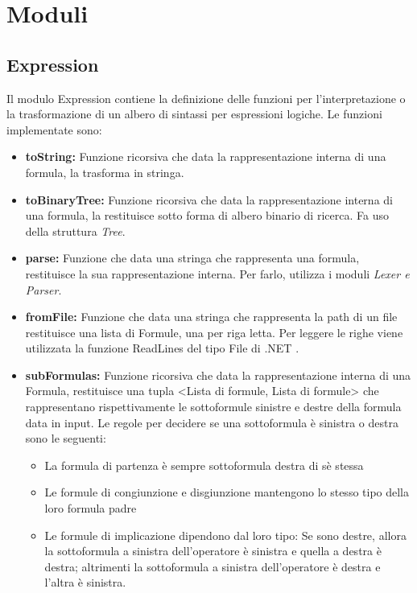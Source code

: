 \documentclass[\main/tesi.tex]{subfiles}
\begin{document}
\section{Moduli}

\subsection{Expression}
Il modulo Expression contiene la definizione delle funzioni per l'interpretazione o la trasformazione di un albero di sintassi per espressioni logiche. Le funzioni implementate sono:
\begin{itemize}
    \item \textbf{toString:} Funzione ricorsiva che data la rappresentazione interna di una formula, la trasforma in stringa.
    \item \textbf{toBinaryTree:} Funzione ricorsiva che data la rappresentazione interna di una formula, la restituisce sotto forma di albero binario di ricerca. Fa uso della struttura \textit{Tree}.
    \item \textbf{parse:} Funzione che data una stringa che rappresenta una formula, restituisce la sua rappresentazione interna. Per farlo, utilizza i moduli \textit{Lexer e Parser}.
    \item \textbf{fromFile:} Funzione che data una stringa che rappresenta la path di un file restituisce una lista di Formule, una per riga letta. Per leggere le righe viene utilizzata la funzione ReadLines del tipo File di .NET \cite{dotnet}.
    \item \textbf{subFormulas:} Funzione ricorsiva che data la rappresentazione interna di una Formula, restituisce una tupla <Lista di formule, Lista di formule> che rappresentano rispettivamente le sottoformule sinistre e destre della formula data in input. Le regole per decidere se una sottoformula è sinistra o destra sono le seguenti:
          \begin{itemize}
              \item La formula di partenza è sempre sottoformula destra di sè stessa
              \item Le formule di congiunzione e disgiunzione mantengono lo stesso tipo della loro formula padre
              \item Le formule di implicazione dipendono dal loro tipo: Se sono destre, allora la sottoformula a sinistra dell'operatore è sinistra e quella a destra è destra; altrimenti la sottoformula a sinistra dell'operatore è destra e l'altra è sinistra.
          \end{itemize}

\end{itemize}
\end{document}
